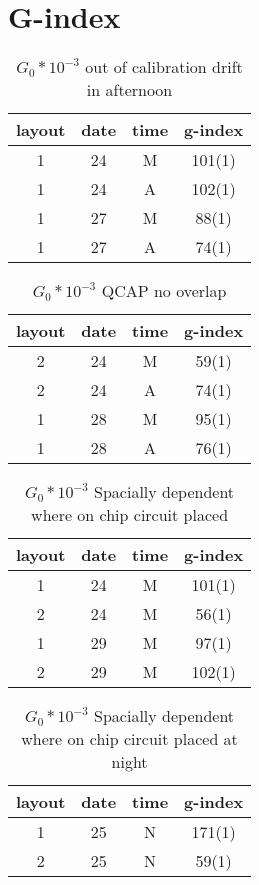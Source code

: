 \documentclass[main.tex]{subfiles}
\begin{document}
\section{G-index}

\begin{table}
\begin{tabular}{cccc}
layout & date & time & g-index\\\hline
1 & 24 & M & 101(1)\\
1 & 24 & A & 102(1)\\
1 & 27 & M & 88(1)\\
1 & 27 & A & 74(1)\\
\end{tabular}
\caption{$G_0 * 10^{-3}$ out of calibration drift in afternoon}
\end{table}

\begin{table}
\begin{tabular}{cccc}
layout & date & time & g-index\\\hline
2 & 24 & M & 59(1)\\
2 & 24 & A & 74(1)\\
1 & 28 & M & 95(1)\\
1 & 28 & A & 76(1)\\
\end{tabular}
\caption{$G_0 * 10^{-3}$ QCAP no overlap}
\end{table}

\begin{table}
\begin{tabular}{cccc}
layout & date & time & g-index\\\hline
1 & 24 & M & 101(1)\\
2 & 24 & M & 56(1)\\
1 & 29 & M & 97(1)\\
2 & 29 & M & 102(1)\\
\end{tabular}
\caption{$G_0 * 10^{-3}$ Spacially dependent where on chip circuit placed}
\end{table}

\begin{table}
\begin{tabular}{cccc}
layout & date & time & g-index\\\hline
1 & 25 & N & 171(1)\\
2 & 25 & N & 59(1)\\
\end{tabular}
\caption{$G_0 * 10^{-3}$ Spacially dependent where on chip circuit placed at night}
\end{table}
\end{document}
